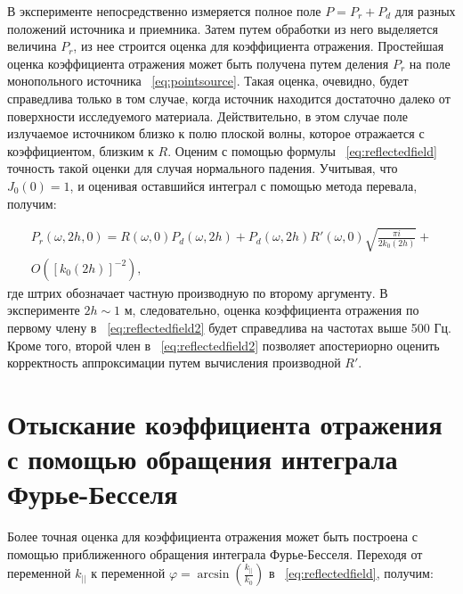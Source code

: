 В эксперименте непосредственно измеряется полное поле $P = P_r + P_d$ для разных положений источника и приемника. Затем путем обработки из него выделяется величина $P_r$, из нее строится оценка для коэффициента отражения. Простейшая оценка коэффициента отражения может быть получена путем деления $P_r$ на поле монопольного источника ~\eqref{eq:pointsource}. Такая оценка, очевидно, будет справедлива только в том случае, когда источник находится достаточно далеко от поверхности исследуемого материала. Действительно, в этом случае поле излучаемое источником близко к полю плоской волны, которое отражается с коэффициентом, близким к $R$. Оценим с помощью формулы ~\eqref{eq:reflectedfield} точность такой оценки для случая нормального падения. Учитывая, что $J_0(0) = 1$, и оценивая оставшийся интеграл с помощью метода перевала, получим:
  		
\begin{multline}
\label{eq:reflectedfield2}
P_r(\omega, 2h, 0) = R(\omega, 0) P_d(\omega, 2h) + P_d(\omega, 2h) R'(\omega, 0) \sqrt{\frac{\pi i}{2k_0(2h)}} +  \\
O([k_0(2h)]^{-2}),
\end{multline}
где штрих обозначает частную  производную по второму аргументу. В эксперименте $2h \sim 1$  м, следовательно, оценка коэффициента отражения по первому члену в ~\eqref{eq:reflectedfield2} будет справедлива на частотах выше 500 Гц. Кроме того, второй член в ~\eqref{eq:reflectedfield2} позволяет апостериорно оценить корректность аппроксимации путем вычисления производной $R'$.



\section{Отыскание коэффициента отражения с помощью обращения интеграла Фурье-Бесселя}

Более точная оценка для коэффициента отражения может быть построена с помощью приближенного обращения интеграла Фурье-Бесселя. Переходя от переменной $k_{||}$ к переменной $\varphi = \arcsin\left(\frac{k_{||}}{k_0}\right)$ в ~\eqref{eq:reflectedfield}, получим:

